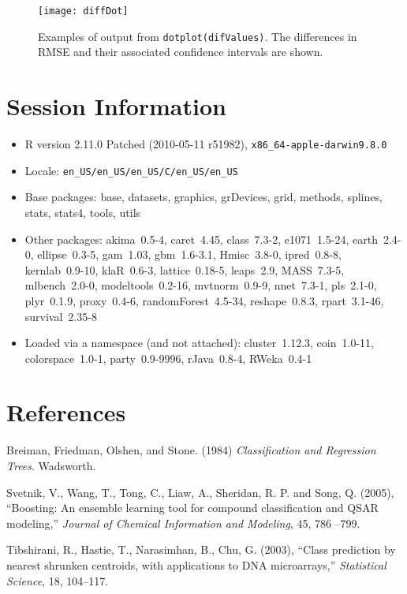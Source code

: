 \documentclass[12pt]{article}
\begin{document}
\begin{figure}
   \begin{center}		
      \texttt{[image: diffDot]}    

      \caption{ Examples of output from
        \texttt{dotplot(difValues)}. The differences in RMSE and their
        associated confidence intervals are shown.}
      \label{F:diffDot} 
    \end{center}
\end{figure} 


\section{Session Information}

\begin{itemize}\raggedright
  \item R version 2.11.0 Patched (2010-05-11 r51982), \verb|x86_64-apple-darwin9.8.0|
  \item Locale: \verb|en_US/en_US/en_US/C/en_US/en_US|
  \item Base packages: base, datasets, graphics, grDevices, grid,
    methods, splines, stats, stats4, tools, utils
  \item Other packages: akima~0.5-4, caret~4.45, class~7.3-2,
    e1071~1.5-24, earth~2.4-0, ellipse~0.3-5, gam~1.03, gbm~1.6-3.1,
    Hmisc~3.8-0, ipred~0.8-8, kernlab~0.9-10, klaR~0.6-3,
    lattice~0.18-5, leaps~2.9, MASS~7.3-5, mlbench~2.0-0,
    modeltools~0.2-16, mvtnorm~0.9-9, nnet~7.3-1, pls~2.1-0,
    plyr~0.1.9, proxy~0.4-6, randomForest~4.5-34, reshape~0.8.3,
    rpart~3.1-46, survival~2.35-8
  \item Loaded via a namespace (and not attached): cluster~1.12.3,
    coin~1.0-11, colorspace~1.0-1, party~0.9-9996, rJava~0.8-4,
    RWeka~0.4-1
\end{itemize}

\section{References}

\begin{description}

   
   \item Breiman, Friedman, Olshen, and Stone. (1984) {\it Classification and Regression Trees}. Wadsworth.


   \item Svetnik, V., Wang, T., Tong, C., Liaw, A., Sheridan, R. P. and Song, Q. (2005), ``Boosting: An ensemble learning tool for compound classification and QSAR modeling,'' {\it Journal of Chemical Information and Modeling}, 45, 786 --799.
   
   \item Tibshirani, R., Hastie, T., Narasimhan, B., Chu, G. (2003), ``Class prediction by nearest shrunken centroids, with applications to DNA microarrays,'' {\it  Statistical Science}, 18, 104--117.


\end{description}
\end{document}
